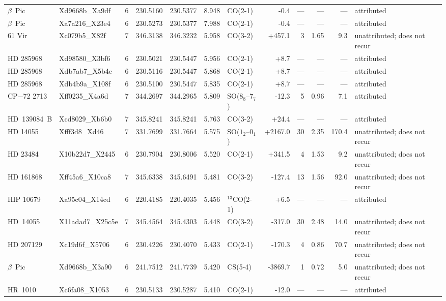 \begin{tabular}{@{}l@{~}l@{~}c@{~}r@{~}r@{~}r@{~}l@{~}r@{~~}r@{~}r@{~}r@{~}l@{}}
$\beta$~Pic & Xd9668b\_Xa9df & 6 & 230.5160 & 230.5377 & 8.948 & CO(2-1) & -0.4 & --- & --- & --- & attributed \\
$\beta$~Pic & Xa7a216\_X23e4 & 6 & 230.5273 & 230.5377 & 7.988 & CO(2-1) & -0.4 & --- & --- & --- & attributed \\
61 Vir & Xc079b5\_X82f & 7 & 346.3138 & 346.3232 & 5.958 & CO(3-2) & +457.1 & 3 & 1.65 & 9.3 & unattributed; does not recur \\
HD 285968 & Xd98580\_X3bf6 & 6 & 230.5021 & 230.5447 & 5.956 & CO(2-1) & +8.7 & --- & --- & --- & attributed \\
HD 285968 & Xdb7ab7\_X5b4e & 6 & 230.5116 & 230.5447 & 5.868 & CO(2-1) & +8.7 & --- & --- & --- & attributed \\
HD 285968 & Xdb4b9a\_X108f & 6 & 230.5100 & 230.5447 & 5.835 & CO(2-1) & +8.7 & --- & --- & --- & attributed \\
CP$-$72 2713 & Xff0235\_X4a6d & 7 & 344.2697 & 344.2965 & 5.809 & SO($8_8$--$7_7$) & -12.3 & 5 & 0.96 & 7.1 & attributed \\
HD~139084~B & Xcd8029\_Xb6b0 & 7 & 345.8241 & 345.8241 & 5.763 & CO(3-2) & +24.4 & --- & --- & --- & attributed \\
HD 14055 & Xfff3d8\_Xd46 & 7 & 331.7699 & 331.7664 & 5.575 & SO($1_2$--$0_1$) & +2167.0 & 30 & 2.35 & 170.4 & unattributed; does not recur \\
HD 23484 & X10b22d7\_X2445 & 6 & 230.7904 & 230.8006 & 5.520 & CO(2-1) & +341.5 & 4 & 1.53 & 9.2 & unattributed; does not recur \\
HD 161868 & Xff45a6\_X10ca8 & 7 & 345.6338 & 345.6491 & 5.481 & CO(3-2) & -127.4 & 13 & 1.56 & 92.0 & unattributed; does not recur \\
HIP 10679 & Xa95c04\_X14cd & 6 & 220.4185 & 220.4035 & 5.456 & $^{13}$CO(2-1) & +6.5 & --- & --- & --- & attributed \\
HD~14055 & X11adad7\_X25c5e & 7 & 345.4564 & 345.4303 & 5.448 & CO(3-2) & -317.0 & 30 & 2.48 & 14.0 & unattributed; does not recur \\
HD 207129 & Xc19d6f\_X5706 & 6 & 230.4226 & 230.4070 & 5.433 & CO(2-1) & -170.3 & 4 & 0.86 & 70.7 & unattributed; does not recur \\
$\beta$~Pic & Xd9668b\_X3a90 & 6 & 241.7512 & 241.7739 & 5.420 & CS(5-4) & -3869.7 & 1 & 0.72 & 5.0 & unattributed; does not recur \\
HR~1010 & Xc6fa08\_X1053 & 6 & 230.5133 & 230.5287 & 5.410 & CO(2-1) & -12.0 & --- & --- & --- & attributed \\

\end{tabular}
